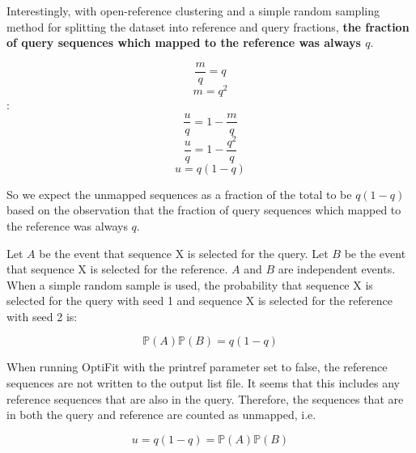 \documentclass{article}
\begin{document}
Interestingly, with open-reference clustering and a simple random sampling method for splitting the dataset into reference and query fractions,
\textbf{the fraction of query sequences which mapped to the reference was always $q$}.

$$\frac{m}{q} = q $$
$$ m = q^2 $$:
$$\frac{u}{q} = 1 - \frac{m}{q} $$
$$\frac{u}{q} = 1 - \frac{q^2}{q} $$
 $$ u = q ( 1 - q )$$

So we expect the unmapped sequences as a fraction of the total to be $q (1 - q)$
based on the observation that the fraction of query sequences which mapped to the reference was always $q$.

Let $A$ be the event that sequence X is selected for the query.
Let $B$ be the event that sequence X is selected for the reference.
$A$ and $B$ are independent events. When a simple random sample is used,
the probability that sequence X is selected for the query with seed 1 and sequence X is selected for the reference with seed 2 is:

$$ \mathbb{P}(A) \mathbb{P}(B) = q ( 1 - q ) $$

When running OptiFit with the printref parameter set to false, the reference sequences are not written to the output list file.
It seems that this includes any reference sequences that are also in the query.
Therefore, the sequences that are in both the query and reference are counted as unmapped, i.e.

$$ u = q ( 1 - q )  = \mathbb{P}(A) \mathbb{P}(B)$$
\end{document}
